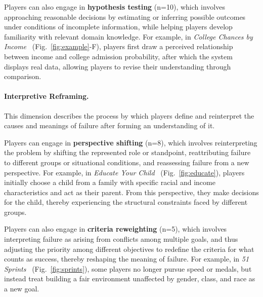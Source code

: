 Players can also engage in \textbf{hypothesis testing} (n=10), which involves approaching reasonable decisions by estimating or inferring possible outcomes under conditions of incomplete information, while helping players develop familiarity with relevant domain knowledge. For example, in \textit{College Chances by Income}~\cite{CollegeChancesbyIncome} (Fig.~\ref{fig:example}-F), players first draw a perceived relationship between income and college admission probability, after which the system displays real data, allowing players to revise their understanding through comparison.

\paragraph{Interpretive Reframing.}
This dimension describes the process by which players define and reinterpret the causes and meanings of failure after forming an understanding of it.

Players can engage in \textbf{perspective shifting} (n=8), which involves reinterpreting the problem by shifting the represented role or standpoint, reattributing failure to different groups or situational conditions, and reassessing failure from a new perspective. For example, in \textit{Educate Your Child}~\cite{EducateYourChild} (Fig.~\ref{fig:educate}), players initially choose a child from a family with specific racial and income characteristics and act as their parent. From this perspective, they make decisions for the child, thereby experiencing the structural constraints faced by different groups.

Players can also engage in \textbf{criteria reweighting} (n=5), which involves interpreting failure as arising from conflicts among multiple goals, and thus adjusting the priority among different objectives to redefine the criteria for what counts as success, thereby reshaping the meaning of failure. For example, in \textit{51 Sprints}~\cite{51sprints} (Fig.~\ref{fig:sprints}), some players no longer pursue speed or medals, but instead treat building a fair environment unaffected by gender, class, and race as a new goal.
